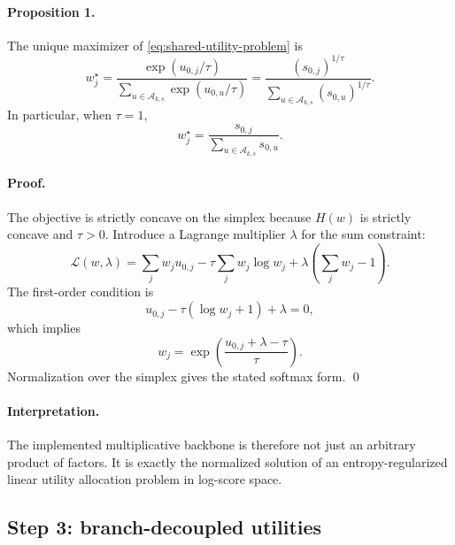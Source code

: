 \paragraph{Proposition 1.}
The unique maximizer of \eqref{eq:shared-utility-problem} is
\begin{equation}
w_j^\star
=
\frac{\exp(u_{0,j}/\tau)}{\sum_{u \in \mathcal{A}_{k,s}} \exp(u_{0,u}/\tau)}
=
\frac{\left(s_{0,j}\right)^{1/\tau}}{\sum_{u \in \mathcal{A}_{k,s}} \left(s_{0,u}\right)^{1/\tau}}.
\end{equation}
In particular, when $\tau=1$,
\begin{equation}
w_j^\star = \frac{s_{0,j}}{\sum_{u \in \mathcal{A}_{k,s}} s_{0,u}}.
\end{equation}

\paragraph{Proof.}
The objective is strictly concave on the simplex because $H(w)$ is strictly concave and $\tau > 0$. Introduce a Lagrange multiplier $\lambda$ for the sum constraint:
\begin{equation}
\mathcal{L}(w,\lambda)
=
\sum_j w_j u_{0,j}
- \tau \sum_j w_j \log w_j
+ \lambda \left(\sum_j w_j - 1\right).
\end{equation}
The first-order condition is
\begin{equation}
u_{0,j} - \tau(\log w_j + 1) + \lambda = 0,
\end{equation}
which implies
\begin{equation}
w_j = \exp\!\left(\frac{u_{0,j} + \lambda - \tau}{\tau}\right).
\end{equation}
Normalization over the simplex gives the stated softmax form. \qed

\paragraph{Interpretation.}
The implemented multiplicative backbone is therefore not just an arbitrary product of factors. It is exactly the normalized solution of an entropy-regularized linear utility allocation problem in log-score space.

\subsection*{Step 3: branch-decoupled utilities}

